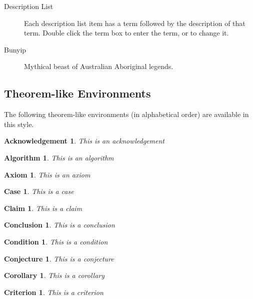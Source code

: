\documentclass{article}
\newtheorem{acknowledgement}[theorem]{Acknowledgement}
\newtheorem{algorithm}[theorem]{Algorithm}
\newtheorem{axiom}[theorem]{Axiom}
\newtheorem{case}[theorem]{Case}
\newtheorem{claim}[theorem]{Claim}
\newtheorem{conclusion}[theorem]{Conclusion}
\newtheorem{condition}[theorem]{Condition}
\newtheorem{conjecture}[theorem]{Conjecture}
\newtheorem{corollary}[theorem]{Corollary}
\newtheorem{criterion}[theorem]{Criterion}
\begin{document}
\begin{description}
\item[Description List] Each description list item has a term followed by
the description of that term. Double click the term box to enter the term,
or to change it.

\item[Bunyip] Mythical beast of Australian Aboriginal legends.
\end{description}

\subsection{Theorem-like Environments}

The following theorem-like environments (in alphabetical order) are
available in this style.

\begin{acknowledgement}
This is an acknowledgement
\end{acknowledgement}

\begin{algorithm}
This is an algorithm
\end{algorithm}

\begin{axiom}
This is an axiom
\end{axiom}

\begin{case}
This is a case
\end{case}

\begin{claim}
This is a claim
\end{claim}

\begin{conclusion}
This is a conclusion
\end{conclusion}

\begin{condition}
This is a condition
\end{condition}

\begin{conjecture}
This is a conjecture
\end{conjecture}

\begin{corollary}
This is a corollary
\end{corollary}

\begin{criterion}
This is a criterion
\end{criterion}
\end{document}
